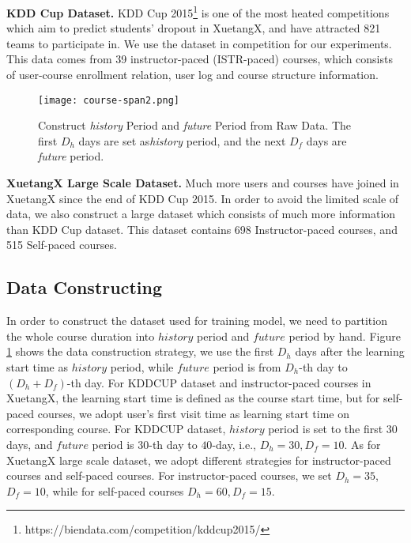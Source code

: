 	\noindent \textbf{KDD Cup Dataset.}
	KDD Cup 2015\footnote{https://biendata.com/competition/kddcup2015/} is one of the most heated competitions which aim to predict students' dropout in XuetangX, and have attracted 821 teams to participate in. We use the dataset in competition for our experiments. This data comes from 39 instructor-paced (ISTR-paced) courses, which consists of user-course enrollment relation, user log and course structure information.\\

	\begin{figure}
		\centering
	\texttt{[image: course-span2.png]}
		
		\caption{Construct \emph{history} Period and \emph{future} Period from Raw Data. The first $D_h$ days are set as\emph{history} period, and the next $D_f$ days are \emph{future} period.}
		\label{fig:dataCons}
	\end{figure}
	\noindent \textbf{XuetangX Large Scale Dataset.}
 	Much more users and courses have joined in XuetangX since the end of KDD Cup 2015. In order to avoid the limited scale of data, we also construct a large dataset which consists of  much more information than KDD Cup dataset. This dataset contains 698 Instructor-paced courses, and 515 Self-paced courses.
	
	
	
	\subsection{Data Constructing}
    In order to construct the dataset used for training model, we need to partition the whole course duration into $history$ period and $future$ period by hand. Figure \ref{fig:dataCons} shows the data construction strategy, we use the first $D_h$ days after the learning start time as $history$ period, while $future$ period is from $D_h$-th day to $(D_h+D_f)$-th day. For KDDCUP dataset and instructor-paced courses in XuetangX, the learning start time is defined as the course start time, but for self-paced courses, we adopt user's first visit time as learning start time on corresponding course. For KDDCUP dataset, $history$ period is set to the first $30$ days, and $future$ period is $30$-th day to $40$-day, i.e., $D_h=30, D_f=10$. As for XuetangX large scale dataset, we adopt different strategies for instructor-paced courses and self-paced courses. For instructor-paced courses, we set $D_h=35$, $D_f=10$, while for self-paced courses $D_h=60, D_f=15$.